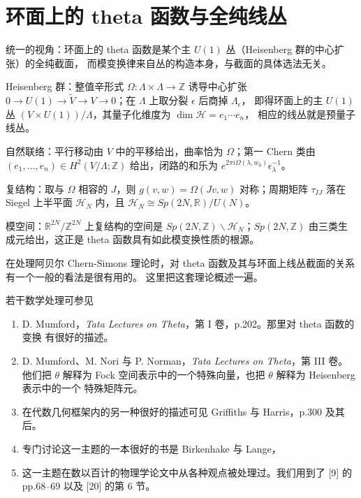 
\section{环面上的 theta 函数与全纯线丛} %

\begin{keytakeaways}
  \item 统一的视角：环面上的 theta 函数是某个主 $U(1)$ 丛（Heisenberg 群的中心扩张）的全纯截面，
    而模变换律来自丛的构造本身，与截面的具体选法无关。
  \item Heisenberg 群：整值辛形式 $\Omega:\Lambda\times\Lambda\to\mathbb{Z}$ 诱导中心扩张
    $0\to U(1)\to\tilde V\to V\to 0$；在 $\Lambda$ 上取分裂 $\epsilon$ 后商掉 $\Lambda_\epsilon$，
    即得环面上的主 $U(1)$ 丛 $(V\times U(1))/\Lambda$，其量子化维度为 $\dim\mathcal{H}=e_1\cdots e_n$，
    相应的线丛就是预量子线丛。
  \item 自然联络：平行移动由 $V$ 中的平移给出，曲率恰为 $\Omega$；第一 Chern 类由
    $(e_1,\dots,e_n)\in H^2(V/\Lambda;\mathbb{Z})$ 给出，闭路的和乐为
    $e^{2\pi i\Omega(\lambda,w_0)}\epsilon_\lambda^{-1}$。
  \item 复结构：取与 $\Omega$ 相容的 $J$，则 $g(v,w)=\Omega(Jv,w)$ 对称；周期矩阵
    $\tau_{IJ}$ 落在 Siegel 上半平面 $\mathcal{H}_N$ 内，且 $\mathcal{H}_N\cong Sp(2N,\mathbb{R})/U(N)$。
  \item 模空间：$\mathbb{R}^{2N}/\mathbb{Z}^{2N}$ 上复结构的空间是
    $Sp(2N,\mathbb{Z})\backslash\mathcal{H}_N$；$Sp(2N,\mathbb{Z})$ 由三类生成元给出，这正是 theta
    函数具有如此模变换性质的根源。
\end{keytakeaways}

在处理阿贝尔 Chern-Simons 理论时，对 theta 函数及其与环面上线丛截面的关系有一个一般的看法是很有用的。
这里把这套理论概述一遍。

若干数学处理可参见

\begin{enumerate}
  \item D. Mumford，\textit{Tata Lectures on Theta}，第 I 卷，p.202。那里对 theta 函数的变换
    有很好的描述。
  \item D. Mumford、M. Nori 与 P. Norman，\textit{Tata Lectures on Theta}，第 III 卷。他们把
    $\theta$ 解释为 Fock 空间表示中的一个特殊向量，也把 $\theta$ 解释为 Heisenberg 表示中的一个
    特殊矩阵元。
  \item 在代数几何框架内的另一种很好的描述可见 Griffiths 与 Harris，p.300 及其后。
  \item 专门讨论这一主题的一本很好的书是 Birkenhake 与 Lange，
  \item 这一主题在数以百计的物理学论文中从各种观点被处理过。我们用到了 [9] 的 pp.68--69 以及
    [20] 的第 6 节。
\end{enumerate}

